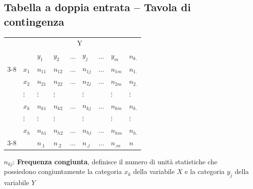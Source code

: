\documentclass[
  a4paper,
  DIV=11,
  numbers=noendperiod]{scrreprt}
\begin{document}
\subsection{Tabella a doppia entrata -- Tavola di
contingenza}\label{tabella-a-doppia-entrata-tavola-di-contingenza}

\begin{center}
\begin{tabular}{
p{0.7cm} p{0.7cm} |
p{0.7cm} p{0.7cm} p{0.7cm} p{0.7cm} p{0.7cm} p{0.7cm} |
p{0.7cm}
}

& \multicolumn{1}{l}{} 
& \multicolumn{6}{c}{Y} 
& \multicolumn{1}{c}{} \\

& \multicolumn{1}{c}{}
& \multicolumn{1}{l}{$y_1$}
& \multicolumn{1}{l}{$y_2$}
& \multicolumn{1}{l}{$\ldots$}
& \multicolumn{1}{l}{$y_j$}
& \multicolumn{1}{l}{$\ldots$}
& \multicolumn{1}{l}{$y_m$}
& \multicolumn{1}{l}{$n_{k.}$} \\

\cline{3-8}

\multirow{6}{*}{X}

& $x_1$
& $n_{11}$
& $n_{12}$
& $\ldots$
& $n_{1j}$
& $\ldots$
& $n_{1m}$
& $n_{1.}$ \\

& $x_2$
& $n_{21}$
& $n_{22}$
& $\ldots$
& $n_{2j}$
& $\ldots$
& $n_{2m}$
& $n_{2.}$ \\

& $\vdots$
& $\vdots$
& $\vdots$
& 
& $\vdots$
& 
& $\vdots$
& $\vdots$ \\

& $x_k$
& $n_{k1}$
& $n_{k2}$
& $\ldots$
& $n_{kj}$
& $\ldots$
& $n_{km}$
& $n_{k.}$ \\

& $\vdots$
& $\vdots$
& $\vdots$
&
& $\vdots$
&
& $\vdots$
& $\vdots$ \\

& $x_h$
& $n_{h1}$
& $n_{h2}$
& $\ldots$
& $n_{hj}$
& $\ldots$
& $n_{hm}$
& $n_{h.}$ \\

\cline{3-8}

&
& $n_{.1}$
& $n_{.2}$
& $\ldots$
& $n_{.j}$
& $\ldots$
& $n_{.m}$
& $n$ \\

\end{tabular}
\end{center}

\(n_{kj}\): \textbf{Frequenza congiunta}, definisce il numero di unità
statistiche che possiedono congiuntamente la categoria \(x_k\) della
variabile \(X\) e la categoria \(y_j\) della variabile \(Y\)
\end{document}
